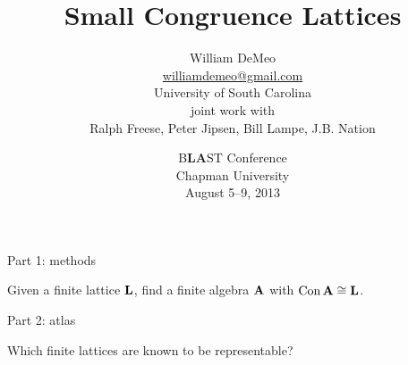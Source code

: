 \documentclass[xcolor=dvipsnames,9pt,hide notes,mathserif]{beamer}
\title{Small Congruence Lattices}
\author[William DeMeo]{William DeMeo\\
{\footnotesize \url{williamdemeo@gmail.com}}\\
{\small University of South Carolina}\\[4pt]
  {\footnotesize joint work with}\\[4pt] 
  Ralph Freese, Peter Jipsen, Bill Lampe, J.B. Nation
}
\date[BLAST 2013]{ %
  B\textcolor{olivegreen}{{\bf LA}}ST Conference\\{\small Chapman University}\\
  {\small August 5--9, 2013}}
\begin{document}
\thicklines



\frame[label=titlepage]{
  \titlepage
}


\begin{frame}[label=part1]{Part 1: methods}
  \begin{center} Given a finite lattice $\mathbf{L}$, find a finite algebra $\mathbf{A}$ with $\mathrm{Con}\, \mathbf{A} \cong \mathbf{L}$.\end{center}
\end{frame}



\begin{frame}[label=part2]{Part 2: atlas}
  \begin{center} Which finite lattices are known to be representable? \end{center}
\end{frame}







\end{document}
